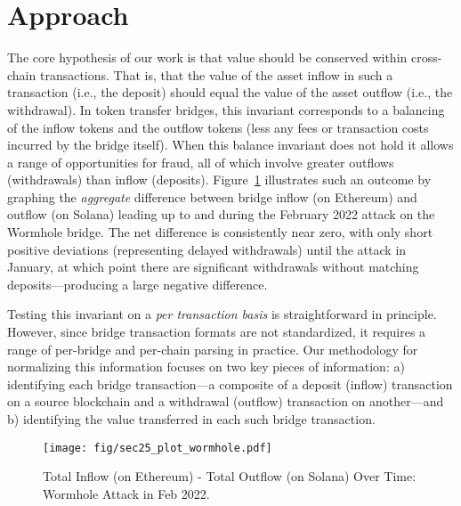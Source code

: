 \section{Approach}
\label{sec:meth}

The core hypothesis of our work is that value should be conserved
within cross-chain transactions.  That is, that the value of the asset
inflow in such a transaction (i.e., the deposit) should equal the
value of the asset outflow (i.e., the withdrawal).  In token transfer
bridges, this invariant corresponds to a balancing of the inflow
tokens and the outflow tokens (less any fees or transaction costs
incurred by the bridge itself).  When this balance invariant does not
hold it allows a range of opportunities for fraud, all of which
involve greater outflows (withdrawals) than inflow
(deposits). Figure~\ref{fig:invariant} illustrates such an outcome by 
graphing the \emph{aggregate} difference between bridge inflow (on
Ethereum) and outflow (on Solana) leading up to and during the
February 2022 attack on the Wormhole bridge.  The net difference is
consistently near zero, with only short positive deviations
(representing delayed withdrawals) until the attack in January, at
which point there are significant withdrawals without matching
deposits---producing a large negative difference.

Testing this invariant on a \emph{per transaction basis} is
straightforward in principle. However, since bridge transaction formats are
not standardized, it requires a range of per-bridge and per-chain
parsing in practice.  Our methodology for normalizing this information
focuses on two key pieces of information: a) identifying each bridge
transaction---a composite of a deposit (inflow) transaction on a
source blockchain and a withdrawal (outflow) transaction on
another---and b) identifying the value transferred in each such bridge
transaction.

\begin{figure}[t]
  \centering
  \texttt{[image: fig/sec25\_plot\_wormhole.pdf]}
  \caption{Total Inflow (on Ethereum) - Total Outflow (on Solana) Over Time: Wormhole Attack in Feb 2022.}
  \label{fig:invariant}

\end{figure}


